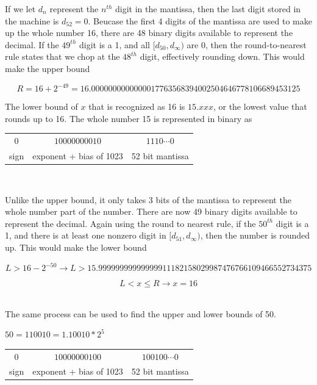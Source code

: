 	If we let $d_n$ represent the $n^{th}$ digit in the mantissa, then the last digit stored in the machine is $d_{52}=0$. %
	Beucase the first 4 digits of the mantissa are used to make up the whole number 16, there are 48 binary digits available to
	represent the decimal. If the $49^{th}$ digit is a 1, and all $[d_{50}, d_{\infty})$ are 0, then the round-to-nearest rule states that
	we chop at the $48^{th}$ digit, effectively rounding down. This would make the upper bound

	$$R = 16 + 2^{-49} = 16.0000000000000017763568394002504646778106689453125$$

	The lower bound of $x$ that is recognized as 16 is $15.xxx$, or the lowest value that rounds up to 16. The whole number 15 is
	represented in binary as

	\begin{center}
	\begin{tabular}{c | c | c}

		$0$ & $10000000010$ & $1110\cdots0$ \\

		sign & exponent + bias of 1023 & 52 bit mantissa \\

	\end{tabular} \\
	\end{center}

	Unlike the upper bound, it only takes 3 bits of the mantissa to represent the whole number part of the number. There are now
	49 binary digits available to represent the decimal. Again using the round to nearest rule, if the $50^{th}$ digit is a 1, and there
	is at least one nonzero digit in $[d_{51}, d_{\infty})$, then the number is rounded up. This would make the lower bound

	$$L > 16 - 2^{-50} \rightarrow L > 15.99999999999999911182158029987476766109466552734375$$

	$$L < x \leq R \rightarrow x = 16$$ \\

	\item The same process can be used to find the upper and lower bounds of 50.

	$50 = 110010 = 1.10010*2^5$ \\

	\begin{center}
	\begin{tabular}{c | c | c}

		$0$ & $10000000100$ & $100100\cdots0$ \\

		sign & exponent + bias of 1023 & 52 bit mantissa \\

	\end{tabular} \\
	\end{center}

